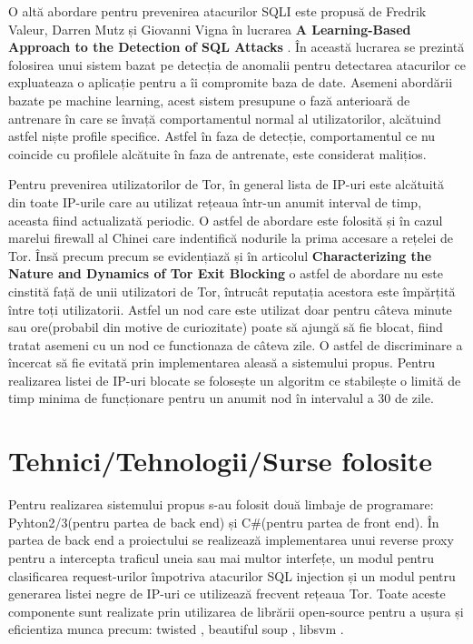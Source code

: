  O altă abordare pentru prevenirea atacurilor SQLI este propusă de Fredrik Valeur, Darren Mutz și Giovanni Vigna în lucrarea \textbf{A Learning-Based Approach to the Detection of SQL Attacks} \cite{sqli_how2}. În această lucrarea se prezintă folosirea unui sistem bazat pe detecția de anomalii pentru detectarea atacurilor ce expluateaza o aplicație pentru a îi compromite baza de date. Asemeni abordării bazate pe machine learning, acest sistem presupune o fază anterioară de antrenare în care se învață comportamentul normal al utilizatorilor, alcătuind astfel niște profile specifice. Astfel în faza de detecție, comportamentul ce nu coincide cu profilele alcătuite în faza de antrenate, este considerat malițios. 

Pentru prevenirea utilizatorilor de Tor, în general lista de IP-uri este alcătuită din toate IP-urile care au utilizat rețeaua într-un anumit interval de timp, aceasta fiind actualizată periodic. O astfel de abordare este folosită și în cazul marelui firewall al Chinei  \cite{china_tor}  care indentifică nodurile la prima accesare a rețelei de Tor. Însă precum precum se evidențiază și în articolul  \textbf{Characterizing the Nature and Dynamics of Tor Exit Blocking} \cite{tor_1} o astfel de abordare nu este cinstită față de unii utilizatori de Tor, întrucât reputația acestora este împărțită între toți utilizatorii. Astfel un nod care este utilizat doar pentru câteva minute sau ore(probabil din motive de curiozitate) poate să ajungă să fie blocat, fiind tratat asemeni cu un nod ce functionaza de câteva zile. O astfel de discriminare a încercat să fie evitată prin implementarea aleasă a sistemului propus. Pentru realizarea listei de IP-uri blocate se folosește un algoritm ce stabilește o limită de timp minima de funcționare pentru un anumit nod în intervalul a 30 de zile. 


 \section{Tehnici/Tehnologii/Surse folosite}

Pentru realizarea sistemului propus s-au folosit două limbaje de programare: Pyhton2/3(pentru partea de back end) și C\#(pentru partea de front end). În partea de back end a proiectului se realizează implementarea unui reverse proxy pentru a intercepta traficul uneia sau mai multor interfețe, un modul pentru clasificarea request-urilor împotriva atacurilor SQL injection și un modul pentru generarea listei negre de IP-uri ce utilizează frecvent rețeaua Tor. Toate aceste componente sunt realizate prin utilizarea de librării open-source pentru a ușura și eficientiza munca precum:  twisted \cite{twisted}, beautiful soup \cite{btf_soup}, libsvm \cite{libsvm}.

